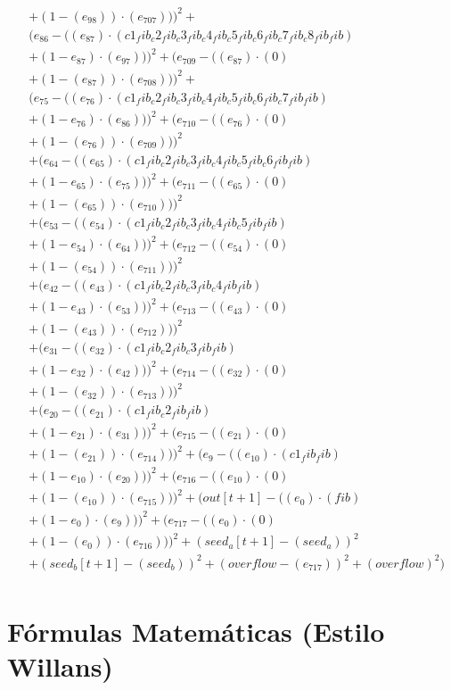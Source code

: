 \documentclass[10pt, a4paper]{article}
\begin{document}
\begin{small}
\begin{align*}
& + (1 - (e_{98})) \cdot (e_{707})))^{2} + \\
& (e_{86} - ((e_{87})  \cdot  (c1_fib_c2_fib_c3_fib_c4_fib_c5_fib_c6_fib_c7_fib_c8_fib_fib) \\
& + (1 - e_{87})  \cdot  (e_{97})))^{2} + (e_{709} - ((e_{87}) \cdot (0) \\
& + (1 - (e_{87})) \cdot (e_{708})))^{2} + \\
& (e_{75} - ((e_{76})  \cdot  (c1_fib_c2_fib_c3_fib_c4_fib_c5_fib_c6_fib_c7_fib_fib) \\
& + (1 - e_{76})  \cdot  (e_{86})))^{2} + (e_{710} - ((e_{76}) \cdot (0) \\
& + (1 - (e_{76})) \cdot (e_{709})))^{2} \\
& + (e_{64} - ((e_{65})  \cdot  (c1_fib_c2_fib_c3_fib_c4_fib_c5_fib_c6_fib_fib) \\
& + (1 - e_{65})  \cdot  (e_{75})))^{2} + (e_{711} - ((e_{65}) \cdot (0) \\
& + (1 - (e_{65})) \cdot (e_{710})))^{2} \\
& + (e_{53} - ((e_{54})  \cdot  (c1_fib_c2_fib_c3_fib_c4_fib_c5_fib_fib) \\
& + (1 - e_{54})  \cdot  (e_{64})))^{2} + (e_{712} - ((e_{54}) \cdot (0) \\
& + (1 - (e_{54})) \cdot (e_{711})))^{2} \\
& + (e_{42} - ((e_{43})  \cdot  (c1_fib_c2_fib_c3_fib_c4_fib_fib) \\
& + (1 - e_{43})  \cdot  (e_{53})))^{2} + (e_{713} - ((e_{43}) \cdot (0) \\
& + (1 - (e_{43})) \cdot (e_{712})))^{2} \\
& + (e_{31} - ((e_{32})  \cdot  (c1_fib_c2_fib_c3_fib_fib) \\
& + (1 - e_{32})  \cdot  (e_{42})))^{2} + (e_{714} - ((e_{32}) \cdot (0) \\
& + (1 - (e_{32})) \cdot (e_{713})))^{2} \\
& + (e_{20} - ((e_{21})  \cdot  (c1_fib_c2_fib_fib) \\
& + (1 - e_{21})  \cdot  (e_{31})))^{2} + (e_{715} - ((e_{21}) \cdot (0) \\
& + (1 - (e_{21})) \cdot (e_{714})))^{2} + (e_{9} - ((e_{10})  \cdot  (c1_fib_fib) \\
& + (1 - e_{10})  \cdot  (e_{20})))^{2} + (e_{716} - ((e_{10}) \cdot (0) \\
& + (1 - (e_{10})) \cdot (e_{715})))^{2} + (out[t+1] - ((e_{0})  \cdot  (fib) \\
& + (1 - e_{0})  \cdot  (e_{9})))^{2} + (e_{717} - ((e_{0}) \cdot (0) \\
& + (1 - (e_{0})) \cdot (e_{716})))^{2} + (seed_a[t+1] - (seed_a))^{2} \\
& + (seed_b[t+1] - (seed_b))^{2} + (overflow - (e_{717}))^{2} + (overflow)^{2}) \\
\end{align*}
\end{small}\part{Fórmulas Matemáticas (Estilo Willans)}
\end{document}

